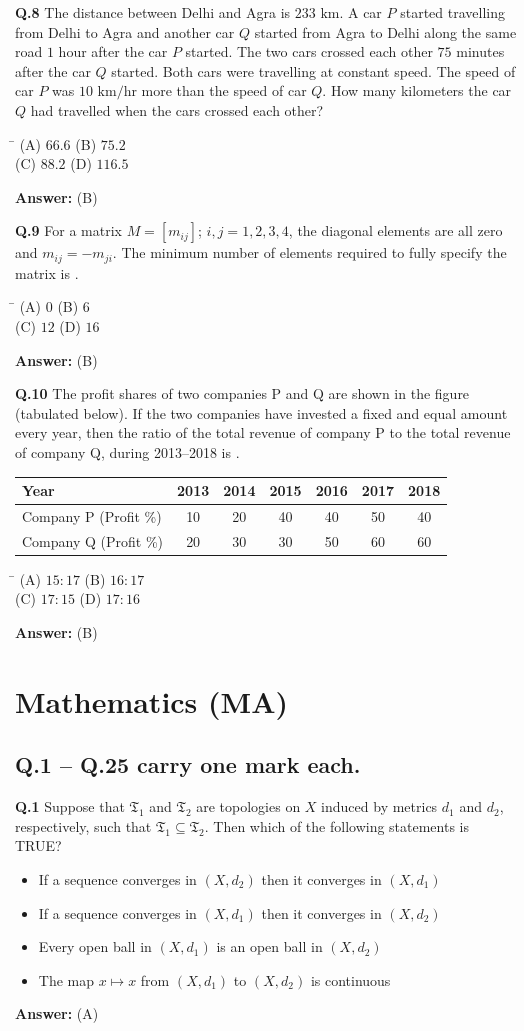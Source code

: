 \documentclass[11pt,a4paper]{article}
\newcommand{\optsfourA}[4]{%
  \begin{tabbing}
    \hspace{0.48\linewidth}\=\kill
    (A) #1 \> (B) #2 \\[2pt]
    (C) #3 \> (D) #4
  \end{tabbing}%
}
\newcommand{\optslistA}[4]{%
  \begin{itemize}
    \setlength{\itemsep}{2pt}\setlength{\parskip}{0pt}
    \item[(A)] #1
    \item[(B)] #2
    \item[(C)] #3
    \item[(D)] #4
  \end{itemize}%
}
\newcommand{\ans}[1]{\textbf{Answer:} #1\par\medskip}
\begin{document}
\textbf{Q.8} The distance between Delhi and Agra is $233\text{ km}$. A car $P$ started travelling from Delhi to Agra and another car $Q$ started from Agra to Delhi along the same road $1$ hour after the car $P$ started. The two cars crossed each other $75$ minutes after the car $Q$ started. Both cars were travelling at constant speed. The speed of car $P$ was $10\text{ km/hr}$ more than the speed of car $Q$. How many kilometers the car $Q$ had travelled when the cars crossed each other?
\optsfourA{$66.6$}{$75.2$}{$88.2$}{$116.5$}
\ans{(B)}

\textbf{Q.9} For a matrix $M = [m_{ij}]$; $i, j = 1, 2, 3, 4$, the diagonal elements are all zero and $m_{ij} = -m_{ji}$. The minimum number of elements required to fully specify the matrix is \underline{\hspace{2cm}}.
\optsfourA{$0$}{$6$}{$12$}{$16$}
\ans{(B)}

\textbf{Q.10} The profit shares of two companies P and Q are shown in the figure (tabulated below). If the two companies have invested a fixed and equal amount every year, then the ratio of the total revenue of company P to the total revenue of company Q, during 2013--2018 is \underline{\hspace{2cm}}.
\begin{center}
\begin{tabular}{lcccccc}
\toprule
Year & 2013 & 2014 & 2015 & 2016 & 2017 & 2018 \\
\midrule
Company P (Profit \%) & 10 & 20 & 40 & 40 & 50 & 40 \\
Company Q (Profit \%) & 20 & 30 & 30 & 50 & 60 & 60 \\
\bottomrule
\end{tabular}
\end{center}
\optsfourA{$15 : 17$}{$16 : 17$}{$17 : 15$}{$17 : 16$}
\ans{(B)}

\section*{Mathematics (MA)}

\subsection*{Q.1 -- Q.25 carry one mark each.}

\textbf{Q.1} Suppose that $\mathfrak{T}_1$ and $\mathfrak{T}_2$ are topologies on $X$ induced by metrics $d_1$ and $d_2$, respectively, such that $\mathfrak{T}_1 \subseteq \mathfrak{T}_2$. Then which of the following statements is TRUE?
\optslistA{If a sequence converges in $(X, d_2)$ then it converges in $(X, d_1)$}{If a sequence converges in $(X, d_1)$ then it converges in $(X, d_2)$}{Every open ball in $(X, d_1)$ is an open ball in $(X, d_2)$}{The map $x \mapsto x$ from $(X, d_1)$ to $(X, d_2)$ is continuous}
\ans{(A)}
\end{document}
